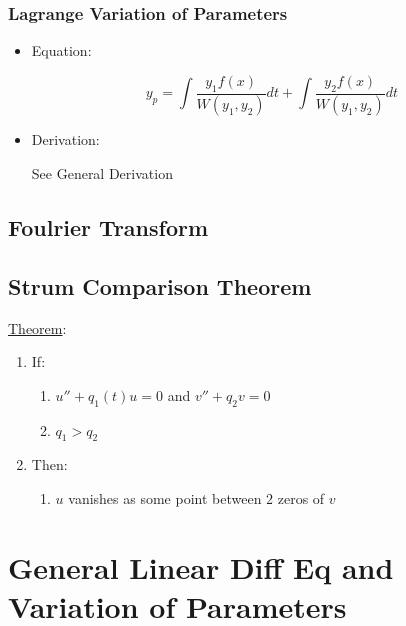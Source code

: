 \documentclass[11pt]{article}
\begin{document}
\subsubsection{Lagrange Variation of Parameters}
\label{sec-11.5.5}

\begin{itemize}

\item Equation:\\
\label{sec-11.5.5.1}

     \begin{equation}
     y_p=\int{\frac{y_1f(x)}{W(y_1,y_2)}dt}+\int{\frac{y_2f(x)}{W(y_1,y_2)}dt}
     \end{equation}

\item Derivation:\\
\label{sec-11.5.5.2}

     See General Derivation
\end{itemize} %
\subsection{Foulrier Transform}
\label{sec-11.6}

\subsection{Strum Comparison Theorem}
\label{sec-11.7}

   \underline{Theorem}: 
\begin{enumerate}
\item If:

\begin{enumerate}
\item $u''+q_1(t)u=0$ and $v''+q_2v =0$
\item $q_1>q_2$
\end{enumerate}

\item Then:

\begin{enumerate}
\item $u$ vanishes as some point between $2$ zeros of $v$
\end{enumerate}

\end{enumerate}
   
\section{General Linear Diff Eq and Variation of Parameters}
\label{sec-12}
\end{document}

